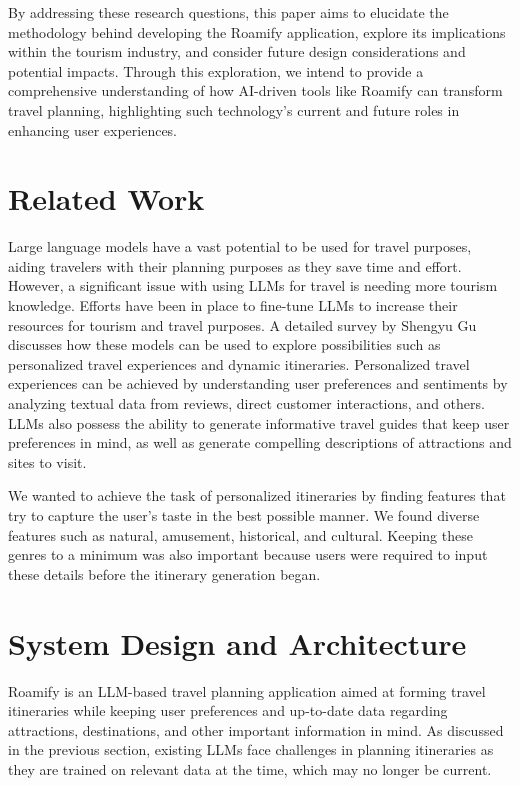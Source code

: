 \documentclass[sigconf,authordraft]{acmart}
\begin{document}
By addressing these research questions, this paper aims to elucidate the methodology behind developing the Roamify application, explore its implications within the tourism industry, and consider future design considerations and potential impacts. Through this exploration, we intend to provide a comprehensive understanding of how AI-driven tools like Roamify can transform travel planning, highlighting such technology's current and future roles in enhancing user experiences.

\section{Related Work}
Large language models have a vast potential to be used for travel purposes, aiding travelers with their planning purposes as they save time and effort. However, a significant issue with using LLMs for travel is needing more tourism knowledge. Efforts have been in place to fine-tune LLMs to increase their resources for tourism and travel purposes\cite{ref3}. A detailed survey by Shengyu Gu discusses how these models can be used to explore possibilities such as personalized travel experiences and dynamic itineraries\cite{ref4}. Personalized travel experiences can be achieved by understanding user preferences and sentiments by analyzing textual data from reviews, direct customer interactions, and others. LLMs also possess the ability to generate informative travel guides that keep user preferences in mind, as well as generate compelling descriptions of attractions and sites to visit.

We wanted to achieve the task of personalized itineraries by finding features that try to capture the user's taste in the best possible manner. We found diverse features such as natural, amusement, historical, and cultural. Keeping these genres to a minimum was also important because users were required to input these details before the itinerary generation began.

\section{System Design and Architecture}
Roamify is an LLM-based travel planning application aimed at forming travel itineraries while keeping user preferences and up-to-date data regarding attractions, destinations, and other important information in mind. As discussed in the previous section, existing LLMs face challenges in planning itineraries as they are trained on relevant data at the time, which may no longer be current.
\end{document}

